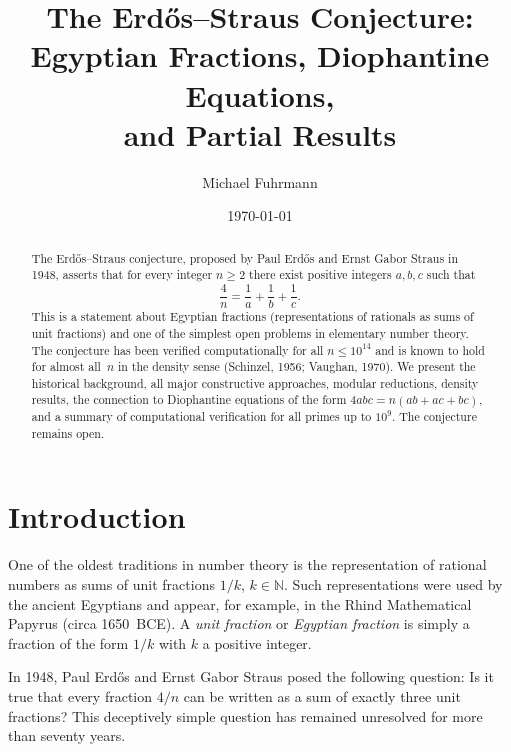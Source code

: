 \documentclass[12pt,a4paper]{amsart}
\theoremstyle{definition}
\newcommand{\N}{\mathbb{N}}
\begin{document}

\title{The Erd\H{o}s--Straus Conjecture:\\
       Egyptian Fractions, Diophantine Equations,\\
       and Partial Results}

\author{Michael Fuhrmann}
\address{Specialist Mathematics Project, Build 133}
\date{\today}

\begin{abstract}
The Erd\H{o}s--Straus conjecture, proposed by Paul Erd\H{o}s and Ernst
Gabor Straus in 1948, asserts that for every integer $n \geq 2$ there exist
positive integers $a, b, c$ such that
\[
  \frac{4}{n} = \frac{1}{a} + \frac{1}{b} + \frac{1}{c}.
\]
This is a statement about Egyptian fractions (representations of rationals
as sums of unit fractions) and one of the simplest open problems in
elementary number theory.  The conjecture has been verified computationally
for all $n \leq 10^{14}$ and is known to hold for almost all~$n$ in the
density sense (Schinzel, 1956; Vaughan, 1970).  We present the historical
background, all major constructive approaches, modular reductions, density
results, the connection to Diophantine equations of the form
$4abc = n(ab+ac+bc)$, and a summary of computational verification for
all primes up to $10^9$.  The conjecture remains open.
\end{abstract}

\maketitle
\tableofcontents

\section{Introduction}

One of the oldest traditions in number theory is the representation of
rational numbers as sums of unit fractions $1/k$, $k \in \N$.  Such
representations were used by the ancient Egyptians and appear, for example,
in the Rhind Mathematical Papyrus (circa 1650~BCE).  A \emph{unit fraction}
or \emph{Egyptian fraction} is simply a fraction of the form $1/k$ with
$k$ a positive integer.

In 1948, Paul Erd\H{o}s and Ernst Gabor Straus posed the following question:
Is it true that every fraction $4/n$ can be written as a sum of exactly
three unit fractions?  This deceptively simple question has remained
unresolved for more than seventy years.
\end{document}
